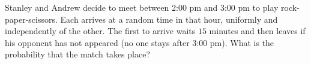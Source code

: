 Stanley and Andrew decide to meet between 2:00 pm and 3:00 pm to play rock-paper-scissors. Each arrives at a random time in that hour, uniformly and independently of the other. The first to arrive waits $15$ minutes and then leaves if his opponent has not appeared (no one stays after 3:00 pm). What is the probability that the match takes place?
